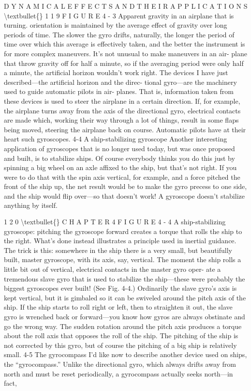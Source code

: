 \documentclass[10pt,oneside]{article}
\begin{document}
D Y N A M I C A L  E F F E C T S  A N D  T H E I R  A P P L I C A T I O N S \textbackslash{}textbullet\{\} 1 1 9 F I G U R E  4 - 3 Apparent gravity in an airplane that is turning. orientation is maintained by the average effect of gravity over long periods of time. The slower the gyro drifts, naturally, the longer the period of time over which this average is effectively taken, and the better the instrument is for more complex maneuvers. It’s not unusual to make maneuvers in an air- plane that throw gravity off for half a minute, so if the averaging period were only half a minute, the artificial horizon wouldn’t work right. The devices I have just described---the artificial horizon and the direc- tional gyro---are the machinery used to guide automatic pilots in air- planes. That is, information taken from these devices is used to steer the airplane in a certain direction. If, for example, the airplane turns away from the axis of the directional gyro, electrical contacts are made which, working their way through a lot of things, result in some flaps being moved, steering the airplane back on course. Automatic pilots have at their heart such gyroscopes. 4-4 A ship-stabilizing gyroscope Another interesting application of gyroscopes that is no longer used today, but was once proposed and built, is to stabilize ships. Of course everybody thinks you do this just by spinning a big wheel on an axle affixed to the ship, but that’s not right. If you were to do that with the spin axis vertical, for example, and a force pitched the front of the ship up, the net result would be to make the gyro precess to one side, and the ship would flip over---so that doesn’t work! A gyroscope doesn’t stabilize anything by itself.\par

1 2 0 \textbackslash{}textbullet\{\} C H A P T E R  4 F I G U R E  4 - 4 A ship-stabilizing gyroscope: pitching the gyroscope forward creates a torque that rolls the ship to the right. What’s done instead illustrates a principle used in inertial guidance. The trick is this: somewhere in the ship there is a very small, but beautifully built, master gyroscope, with its axis, say, vertical. The moment the ship rolls a little bit out of vertical, electrical contacts in the master gyro oper- ate a tremendous slave gyro that is used to stabilize the ship---these were probably the biggest gyroscopes ever built! (See Fig. 4-4.) Ordinarily the slave gyro’s axis is kept vertical, but it is gimbaled so it can be swiveled around the pitch axis of the ship. If the ship starts to roll right or left, then to straighten it out, the slave gyro is wrenched back or forward---you know how gyros are always obstinate and go the wrong way. The sudden rotation around the pitch axis produces a torque about the roll axis that opposes the roll of the ship. The pitching of the ship is not corrected by this gyro, but of course the pitching of a big ship is relatively small. 4-5 The gyrocompass I’d like now to describe another device used on ships, the “gyrocompass.” Unlike the directional gyro, which always drifts away from north and must be reset periodically, a gyrocompass actually seeks north---in fact,\par
\end{document}
